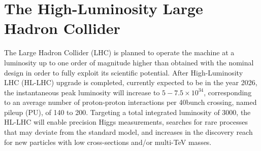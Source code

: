 \section{The High-Luminosity Large Hadron Collider}\label{sec:hl-lhc}

The Large Hadron Collider (LHC) \cite{LHCMachine} is planned to operate the machine at a luminosity up to one order of magnitude higher than obtained with the nominal design in order to fully exploit its scientific potential.  After High-Luminosity LHC (HL-LHC) upgrade \cite{hl-lhc-prelim-design-report} is completed, currently expected to be in the year 2026, the instantaneous peak luminosity will increase to $5-7.5 \times {10}^{34}$\percms, corresponding to an average number of proton-proton interactions per 40\MHz bunch crossing, named pileup (PU), of 140 to 200. Targeting a total integrated luminosity of $3000$\fbinv, the HL-LHC will enable precision Higgs measurements, searches for rare processes that may deviate from the standard model, and increases in the discovery reach for new particles with low cross-sections and/or multi-TeV masses.
